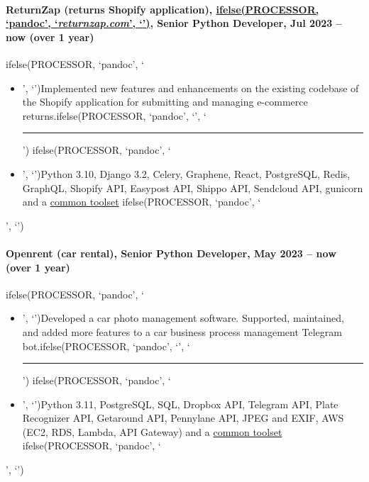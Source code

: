 \documentclass[a4paper,8pt]{extarticle}
\newcommand{\chref}[2]{\href{#1}
{ifelse(PROCESSOR, `pandoc', `#2', `\underline{\smash{#2}}')}}
\newcommand{\itchref}[2]{\chref{#1}{\textit{#2}}}  %
\newcommand{\chrule}{ifelse(PROCESSOR, `pandoc', `', `\vspace{3pt}\hrule')}
\newcommand{\pdbeginitemize}{ifelse(PROCESSOR, `pandoc', `\begin{itemize}', `')}
\newcommand{\pditem}{ifelse(PROCESSOR, `pandoc', `\item', `')}
\newcommand{\pdenditemize}{ifelse(PROCESSOR, `pandoc', `\end{itemize}', `')}
\begin{document}
\paragraph*{ReturnZap (returns Shopify application), \itchref{https://returnzap.com}{returnzap.com}, Senior Python Developer, Jul 2023 -- now (over 1 year)}
\pdbeginitemize
\pditem Implemented new features and enhancements on the existing codebase of the Shopify application for submitting and managing e-commerce returns.\chrule
\pditem Python 3.10, Django 3.2, Celery, Graphene, React, PostgreSQL, Redis, GraphQL, Shopify API, Easypost API, Shippo API, Sendcloud API, gunicorn and a \hyperlink{common-toolset}{common toolset}
\pdenditemize

\paragraph*{Openrent (car rental), Senior Python Developer, May 2023 -- now (over 1 year)}
\pdbeginitemize
\pditem Developed a car photo management software. Supported, maintained, and added more features to a car business process management Telegram bot.\chrule
\pditem Python 3.11, PostgreSQL, SQL, Dropbox API, Telegram API, Plate Recognizer API, Getaround API, Pennylane API, JPEG and EXIF, AWS (EC2, RDS, Lambda, API Gateway) and a \hyperlink{common-toolset}{common toolset}
\pdenditemize
\end{document}
